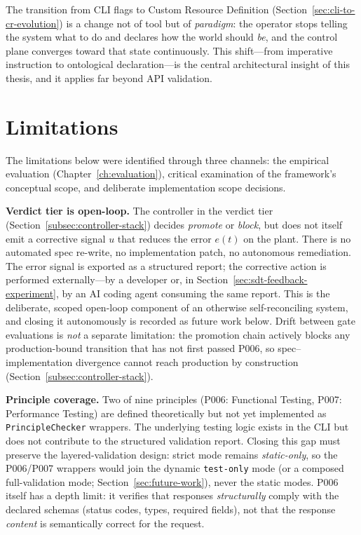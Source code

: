 The transition from CLI flags to Custom Resource Definition (Section~\ref{sec:cli-to-cr-evolution}) is a change not of tool but of \textit{paradigm}: the operator stops telling the system what to do and declares how the world should \textit{be}, and the control plane converges toward that state continuously. This shift---from imperative instruction to ontological declaration---is the central architectural insight of this thesis, and it applies far beyond API validation.

\section{Limitations}
\label{sec:limitations}

The limitations below were identified through three channels: the empirical evaluation (Chapter~\ref{ch:evaluation}), critical examination of the framework's conceptual scope, and deliberate implementation scope decisions.

\textbf{Verdict tier is open-loop.} The controller in the verdict tier (Section~\ref{subsec:controller-stack}) decides \emph{promote} or \emph{block}, but does not itself emit a corrective signal $u$ that reduces the error $e(t)$ on the plant. There is no automated spec re-write, no implementation patch, no autonomous remediation. The error signal is exported as a structured report; the corrective action is performed externally---by a developer or, in Section~\ref{sec:sdt-feedback-experiment}, by an AI coding agent consuming the same report. This is the deliberate, scoped open-loop component of an otherwise self-reconciling system, and closing it autonomously is recorded as future work below. Drift between gate evaluations is \emph{not} a separate limitation: the promotion chain actively blocks any production-bound transition that has not first passed P006, so spec--implementation divergence cannot reach production by construction (Section~\ref{subsec:controller-stack}).

\textbf{Principle coverage.} Two of nine principles (P006: Functional Testing, P007: Performance Testing) are defined theoretically but not yet implemented as \texttt{PrincipleChecker} wrappers. The underlying testing logic exists in the CLI but does not contribute to the structured validation report. Closing this gap must preserve the layered-validation design: strict mode remains \emph{static-only}, so the P006/P007 wrappers would join the dynamic \texttt{test-only} mode (or a composed full-validation mode; Section~\ref{sec:future-work}), never the static modes. P006 itself has a depth limit: it verifies that responses \emph{structurally} comply with the declared schemas (status codes, types, required fields), not that the response \emph{content} is semantically correct for the request.

